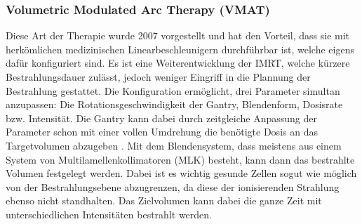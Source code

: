 \subsubsection{Volumetric Modulated Arc Therapy (VMAT)}
Diese Art der Therapie wurde 2007 vorgestellt und hat den Vorteil, dass sie mit herkömlichen medizinischen Linearbeschleunigern durchführbar ist, welche eigens dafür konfiguriert sind.\cite{nicht_so_shady_author}
Es ist eine Weiterentwicklung der IMRT, welche kürzere Bestrahlungsdauer zulässt, jedoch weniger Eingriff in die Plannung der Bestrahlung gestattet.
Die Konfiguration ermöglicht, drei Parameter simultan anzupassen: Die Rotationsgeschwindigkeit der Gantry, Blendenform, Dosisrate bzw. Intensität. 
Die Gantry kann dabei durch zeitgleiche Anpassung der Parameter schon mit einer vollen Umdrehung die benötigte Dosis an das Targetvolumen abzugeben .
Mit dem Blendensystem, dass meistens aus einem System von Multilamellenkollimatoren (MLK) besteht, kann dann das bestrahlte Volumen festgelegt werden.
Dabei ist es wichtig gesunde Zellen sogut wie möglich von der Bestrahlungsebene abzugrenzen, da diese der ionisierenden Strahlung ebenso nicht standhalten.
Das Zielvolumen kann dabei die ganze Zeit mit unterschiedlichen Intensitäten bestrahlt werden.\cite{haha_ka}






